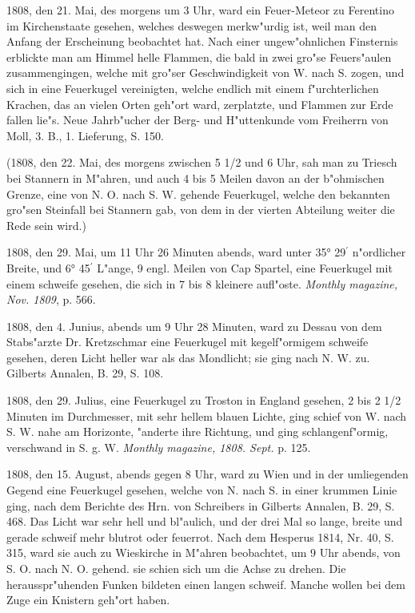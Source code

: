 \documentclass[a4paper, 11pt, oneside, polutonikogreek, german]{article}
\begin{document}
1808, den 21. Mai, des morgens um 3 Uhr, ward ein Feuer-Meteor zu Ferentino im Kirchenstaate gesehen, welches deswegen merkw"urdig ist, weil man den Anfang der Erscheinung beobachtet hat. Nach einer ungew"ohnlichen Finsternis erblickte man am Himmel helle Flammen, die bald in zwei gro"se Feuers"aulen zusammengingen, welche mit gro"ser Geschwindigkeit von W. nach S. zogen, und sich in eine Feuerkugel vereinigten, welche endlich mit einem f"urchterlichen Krachen, das an vielen Orten geh"ort ward, zerplatzte, und Flammen zur Erde fallen lie"s. Neue Jahrb"ucher der Berg- und H"uttenkunde vom Freiherrn von Moll, 3. B., 1. Lieferung, S. 150.

(1808, den 22. Mai, des morgens zwischen 5 1/2 und 6 Uhr, sah man zu Triesch bei Stannern in M"ahren, und auch 4 bis 5 Meilen davon an der b"ohmischen Grenze, eine von N. O. nach S. W. gehende Feuerkugel, welche den bekannten gro"sen Steinfall bei Stannern gab, von dem in der vierten Abteilung weiter die Rede sein wird.)

1808, den 29. Mai, um 11 Uhr 26 Minuten abends, ward unter 35° 29$^{\prime}$ n"ordlicher Breite, und 6° 45$^{\prime}$ L"ange, 9 engl. Meilen von Cap Spartel, eine Feuerkugel mit einem schweife gesehen, die sich in 7 bis 8 kleinere aufl"oste. \emph{Monthly magazine, Nov. 1809}, p. 566.

1808, den 4. Junius, abends um 9 Uhr 28 Minuten, ward zu Dessau von dem Stabs"arzte Dr. Kretzschmar eine Feuerkugel mit kegelf"ormigem schweife gesehen, deren Licht heller war als das Mondlicht; sie ging nach N. W. zu. Gilberts Annalen, B. 29, S. 108.

1808, den 29. Julius, eine Feuerkugel zu Troston in England gesehen, 2 bis 2 1/2 Minuten im Durchmesser, mit sehr hellem blauen Lichte, ging schief von W. nach S. W. nahe am Horizonte, "anderte ihre Richtung, und ging schlangenf"ormig, verschwand in S. g. W. \emph{Monthly magazine, 1808. Sept.} p. 125.

1808, den 15. August, abends gegen 8 Uhr, ward zu Wien und in der umliegenden Gegend eine Feuerkugel gesehen, welche von N. nach S. in einer krummen Linie ging, nach dem Berichte des Hrn. von Schreibers in Gilberts Annalen, B. 29, S. 468. Das Licht war sehr hell und bl"aulich, und der drei Mal so lange, breite und gerade schweif mehr blutrot oder feuerrot. Nach dem Hesperus 1814, Nr. 40, S. 315, ward sie auch zu Wieskirche in M"ahren beobachtet, um 9 Uhr abends, von S. O. nach N. O. gehend. sie schien sich um die Achse zu drehen. Die herausspr"uhenden Funken bildeten einen langen schweif. Manche wollen bei dem Zuge ein Knistern geh"ort haben.
\end{document}
